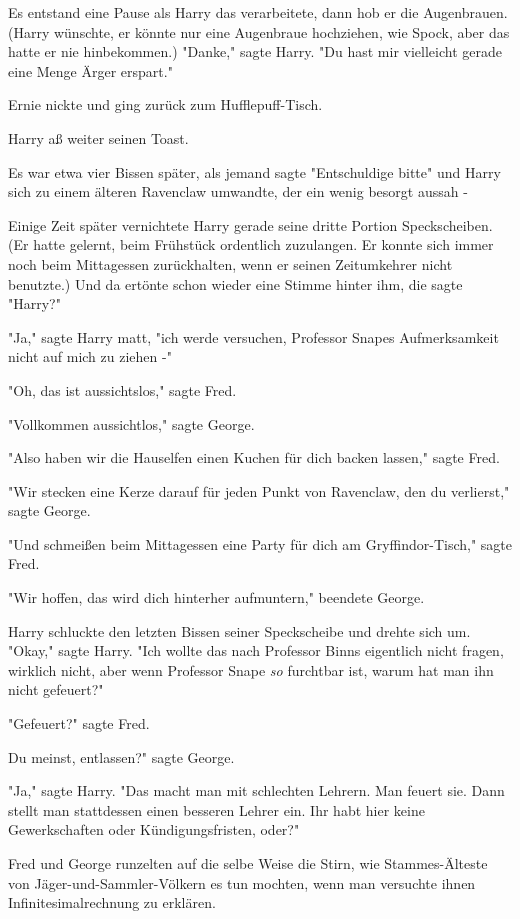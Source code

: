 {Es entstand eine Pause als Harry das verarbeitete, dann hob er die Augenbrauen. (Harry wünschte, er könnte nur eine Augenbraue hochziehen, wie Spock, aber das hatte er nie hinbekommen.) "Danke," sagte Harry. "Du hast mir vielleicht gerade eine Menge Ärger erspart."

Ernie nickte und ging zurück zum Hufflepuff-Tisch.

Harry aß weiter seinen Toast.

Es war etwa vier Bissen später, als jemand sagte "Entschuldige bitte" und Harry sich zu einem älteren Ravenclaw umwandte, der ein wenig besorgt aussah -

Einige Zeit später vernichtete Harry gerade seine dritte Portion Speckscheiben. (Er hatte gelernt, beim Frühstück ordentlich zuzulangen. Er konnte sich immer noch beim Mittagessen zurückhalten, wenn er seinen Zeitumkehrer nicht benutzte.) Und da ertönte schon wieder eine Stimme hinter ihm, die sagte "Harry?"

"Ja," sagte Harry matt, "ich werde versuchen, Professor Snapes Aufmerksamkeit nicht auf mich zu ziehen -"

"Oh, das ist aussichtslos," sagte Fred.

"Vollkommen aussichtlos," sagte George.

"Also haben wir die Hauselfen einen Kuchen für dich backen lassen," sagte Fred.

"Wir stecken eine Kerze darauf für jeden Punkt von Ravenclaw, den du verlierst," sagte George.

"Und schmeißen beim Mittagessen eine Party für dich am Gryffindor-Tisch," sagte Fred.

"Wir hoffen, das wird dich hinterher aufmuntern," beendete George.

Harry schluckte den letzten Bissen seiner Speckscheibe und drehte sich um. "Okay," sagte Harry. "Ich wollte das nach Professor Binns eigentlich nicht fragen, wirklich nicht, aber wenn Professor Snape \emph{so} furchtbar ist, warum hat man ihn nicht gefeuert?"

"Gefeuert?" sagte Fred.

Du meinst, entlassen?" sagte George.

"Ja," sagte Harry. "Das macht man mit schlechten Lehrern. Man feuert sie. Dann stellt man stattdessen einen besseren Lehrer ein. Ihr habt hier keine Gewerkschaften oder Kündigungsfristen, oder?"

Fred und George runzelten auf die selbe Weise die Stirn, wie Stammes-Älteste von Jäger-und-Sammler-Völkern es tun mochten, wenn man versuchte ihnen Infinitesimalrechnung zu erklären.

}
